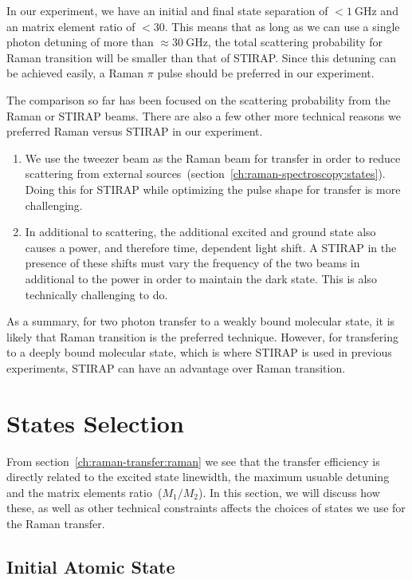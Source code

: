 In our experiment, we have an initial and final state separation of $<\!1~\mathrm{GHz}$
and an matrix element ratio of $<\!30$.
This means that as long as we can use a single photon detuning of more than
$\approx\!30~\mathrm{GHz}$, the total scattering probability for Raman transition
will be smaller than that of STIRAP.
Since this detuning can be achieved easily,
a Raman $\pi$ pulse should be preferred in our experiment.

The comparison so far has been focused on the scattering probability from the Raman or STIRAP
beams. There are also a few other more technical reasons we preferred Raman versus STIRAP
in our experiment.

\begin{enumerate}
\item We use the tweezer beam as the Raman beam for transfer in order to reduce scattering
  from external sources~(section~\ref{ch:raman-spectroscopy:states}).
  Doing this for STIRAP while optimizing the pulse shape for transfer is more challenging.
\item In additional to scattering, the additional excited and ground state
  also causes a power, and therefore time, dependent light shift.
  A STIRAP in the presence of these shifts must vary the frequency of the two beams
  in additional to the power in order to maintain the dark state.
  This is also technically challenging to do.
\end{enumerate}

As a summary, for two photon transfer to a weakly bound molecular state,
it is likely that Raman transition is the preferred technique.
However, for transfering to a deeply bound molecular state,
which is where STIRAP is used in previous experiments,
STIRAP can have an advantage over Raman transition.

\section{States Selection}
\label{ch:raman-transfer:state-selction}

From section~\ref{ch:raman-transfer:raman} we see that the transfer efficiency
is directly related to the excited state linewidth, the maximum usuable detuning
and the matrix elements ratio~($M_1/M_2$).
In this section, we will discuss how these, as well as other technical constraints
affects the choices of states we use for the Raman transfer.

\subsection{Initial Atomic State}
\label{ch:raman-transfer:state-selction:init}

